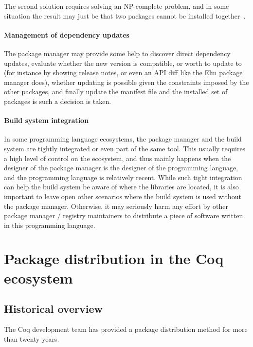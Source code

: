 The second solution requires solving an NP-complete problem, and in some situation the result may just be that two packages cannot be installed together~\cite{mancinelli2006managing}.

\paragraph{Management of dependency updates}

The package manager may provide some help to discover direct dependency updates, evaluate whether the new version is compatible, or worth to update to (for instance by showing release notes, or even an API diff like the Elm package manager does), whether updating is possible given the constraints imposed by the other packages, and finally update the manifest file and the installed set of packages is such a decision is taken.

\paragraph{Build system integration}

In some programming language ecosystems, the package manager and the build system are tightly integrated or even part of the same tool.
This usually requires a high level of control on the ecosystem, and thus mainly happens when the designer of the package manager is the designer of the programming language, and the programming language is relatively recent.
While such tight integration can help the build system be aware of where the libraries are located, it is also important to leave open other scenarios where the build system is used without the package manager.
Otherwise, it may seriously harm any effort by other package manager / registry maintainers to distribute a piece of software written in this programming language.

\section{Package distribution in the Coq ecosystem}

\subsection{Historical overview}

\label{sec:coq-package-distribution-history}

The Coq development team has provided a package distribution method for more than twenty years.

